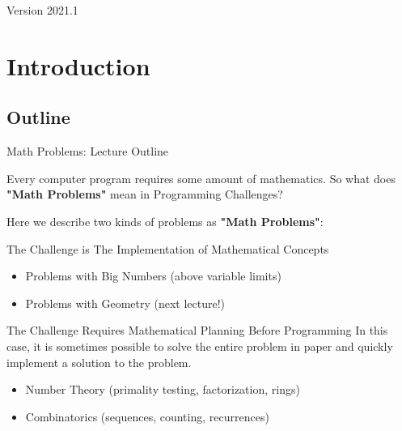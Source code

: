 \documentclass[aspectratio=169]{beamer}
\subtitle[Week 8: Mathematics]{Week 8 - Mathematics}
\date[]{{\smaller(last updated: \today)}}
\begin{document}
\begin{CJK}{UTF8}{ipxm}

\begin{frame}
\maketitle
\vfill

\hfill Version 2021.1
\end{frame}

\section{Introduction}

\subsection{Outline}
\begin{frame}{Math Problems: Lecture Outline}

  Every computer program requires some amount of mathematics. So what does {\bf "Math Problems"} mean in Programming Challenges?\bigskip

  Here we describe two kinds of problems as {\bf "Math Problems"}:

  \begin{block}{The Challenge is The Implementation of Mathematical Concepts}
    \begin{itemize}
      \item Problems with Big Numbers (above variable limits)
      \item Problems with Geometry (next lecture!)
    \end{itemize}
  \end{block}
  \begin{exampleblock}{The Challenge Requires Mathematical Planning Before Programming}
    In this case, it is sometimes possible to solve the entire problem in paper and quickly implement a solution to the problem.
    \begin{itemize}
      \item Number Theory (primality testing, factorization, rings)
      \item Combinatorics (sequences, counting, recurrences)
    \end{itemize}
  \end{exampleblock}
\end{frame}





\end{CJK}
\end{document}
